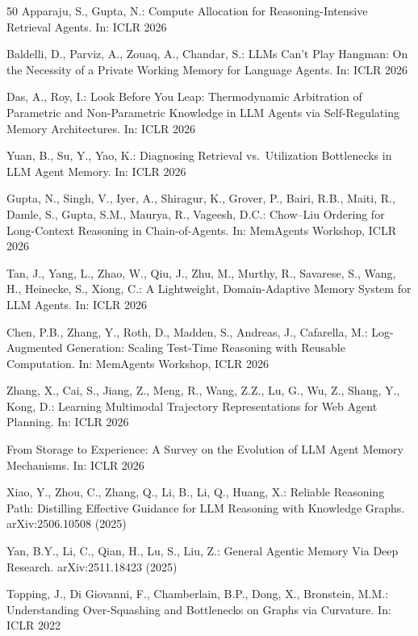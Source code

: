 \documentclass[hf]{ceurart}
\begin{document}
\begin{thebibliography}{50}
Apparaju, S., Gupta, N.:
Compute Allocation for Reasoning-Intensive Retrieval Agents.
In: ICLR 2026

Baldelli, D., Parviz, A., Zouaq, A., Chandar, S.:
LLMs Can't Play Hangman: On the Necessity of a Private Working
Memory for Language Agents. In: ICLR 2026

Das, A., Roy, I.: Look Before You Leap: Thermodynamic Arbitration
of Parametric and Non-Parametric Knowledge in LLM Agents via
Self-Regulating Memory Architectures. In: ICLR 2026

Yuan, B., Su, Y., Yao, K.: Diagnosing Retrieval vs.\ Utilization
Bottlenecks in LLM Agent Memory. In: ICLR 2026

Gupta, N., Singh, V., Iyer, A., Shiragur, K., Grover, P.,
Bairi, R.B., Maiti, R., Damle, S., Gupta, S.M., Maurya, R.,
Vageesh, D.C.: Chow--Liu Ordering for Long-Context Reasoning in
Chain-of-Agents. In: MemAgents Workshop, ICLR 2026

Tan, J., Yang, L., Zhao, W., Qiu, J., Zhu, M., Murthy, R.,
Savarese, S., Wang, H., Heinecke, S., Xiong, C.:
A Lightweight, Domain-Adaptive Memory System for LLM Agents.
In: ICLR 2026

Chen, P.B., Zhang, Y., Roth, D., Madden, S., Andreas, J.,
Cafarella, M.: Log-Augmented Generation: Scaling Test-Time
Reasoning with Reusable Computation. In: MemAgents Workshop,
ICLR 2026

Zhang, X., Cai, S., Jiang, Z., Meng, R., Wang, Z.Z., Lu, G.,
Wu, Z., Shang, Y., Kong, D.: Learning Multimodal Trajectory
Representations for Web Agent Planning. In: ICLR 2026

From Storage to Experience: A Survey on the Evolution of LLM Agent
Memory Mechanisms. In: ICLR 2026

Xiao, Y., Zhou, C., Zhang, Q., Li, B., Li, Q., Huang, X.:
Reliable Reasoning Path: Distilling Effective Guidance for LLM
Reasoning with Knowledge Graphs. arXiv:2506.10508 (2025)

Yan, B.Y., Li, C., Qian, H., Lu, S., Liu, Z.:
General Agentic Memory Via Deep Research. arXiv:2511.18423 (2025)

Topping, J., Di Giovanni, F., Chamberlain, B.P., Dong, X.,
Bronstein, M.M.: Understanding Over-Squashing and Bottlenecks on
Graphs via Curvature. In: ICLR 2022


\end{thebibliography}
\end{document}
